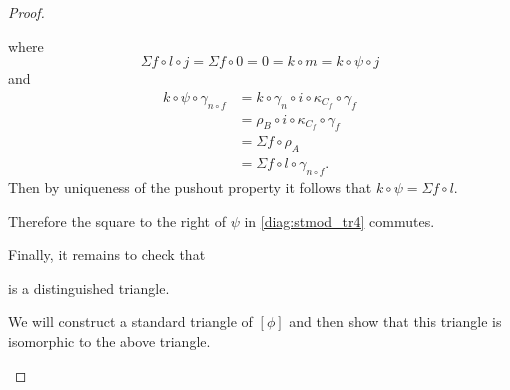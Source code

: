 \begin{proof}
\begin{enumerate}[label={(\bfseries TR\arabic*)}]
{\begin{center}
            \end{center}
            where
            \[
                \Sigma f \circ l \circ j = \Sigma f \circ 0 = 0 = k \circ m = k \circ \psi \circ j
            \]
            and
            \begin{align*}
                k \circ \psi \circ \gamma_{n \circ f} &= k \circ \gamma_n \circ i \circ \kappa_{C_f} \circ \gamma_f \\
                &= \rho_B \circ i \circ \kappa_{C_f} \circ \gamma_f \\
                &= \Sigma f \circ \rho_A \\
                &= \Sigma f \circ l \circ \gamma_{n \circ f}.
            \end{align*}
            Then by uniqueness of the pushout property it follows that \( k \circ \psi = \Sigma f \circ l \).
                
            Therefore the square to the right of \( \psi \) in \autoref{diag:stmod_tr4} commutes.

            Finally, it remains to check that
            \begin{center}
            \end{center}
            is a distinguished triangle.

            We will construct a standard triangle of \( [\phi] \) and then show that this triangle is isomorphic to the above triangle.

}
\end{enumerate}
\end{proof}
